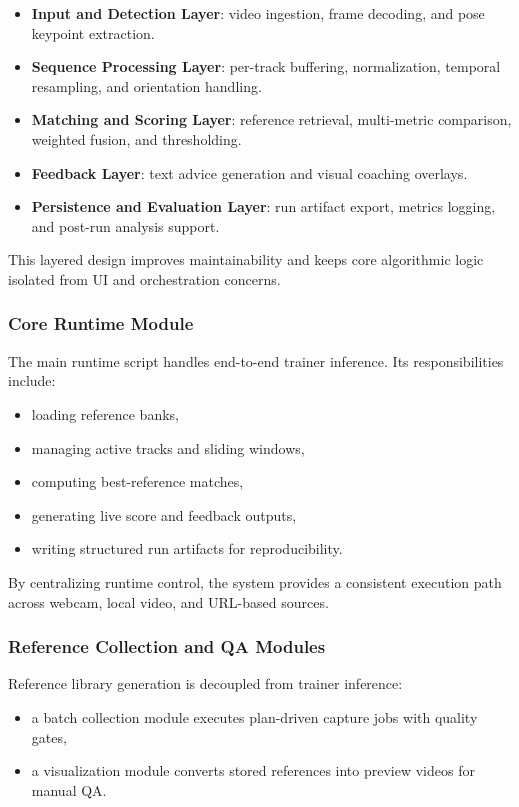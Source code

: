 \documentclass[12pt]{article}
\begin{document}
{\begin{itemize}
    \item \textbf{Input and Detection Layer}: video ingestion, frame decoding, and pose keypoint extraction.
    \item \textbf{Sequence Processing Layer}: per-track buffering, normalization, temporal resampling, and orientation handling.
    \item \textbf{Matching and Scoring Layer}: reference retrieval, multi-metric comparison, weighted fusion, and thresholding.
    \item \textbf{Feedback Layer}: text advice generation and visual coaching overlays.
    \item \textbf{Persistence and Evaluation Layer}: run artifact export, metrics logging, and post-run analysis support.
\end{itemize}

This layered design improves maintainability and keeps core algorithmic logic isolated from UI and orchestration concerns.

\subsubsection{Core Runtime Module}

The main runtime script handles end-to-end trainer inference. Its responsibilities include:

\begin{itemize}
    \item loading reference banks,
    \item managing active tracks and sliding windows,
    \item computing best-reference matches,
    \item generating live score and feedback outputs,
    \item writing structured run artifacts for reproducibility.
\end{itemize}

By centralizing runtime control, the system provides a consistent execution path across webcam, local video, and URL-based sources.

\subsubsection{Reference Collection and QA Modules}

Reference library generation is decoupled from trainer inference:

\begin{itemize}
    \item a batch collection module executes plan-driven capture jobs with quality gates,
    \item a visualization module converts stored references into preview videos for manual QA.
\end{itemize}

}
\end{document}
